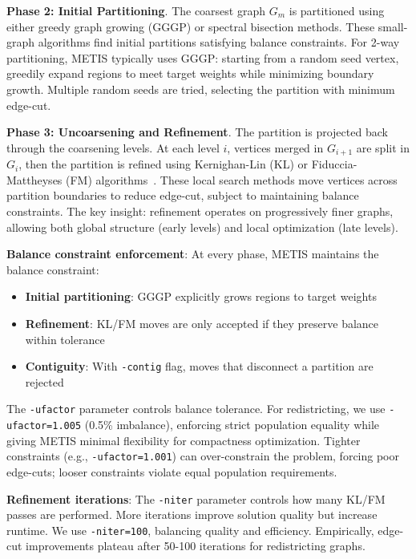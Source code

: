 \textbf{Phase 2: Initial Partitioning}. The coarsest graph $G_m$ is partitioned using either greedy graph growing (GGGP) or spectral bisection methods. These small-graph algorithms find initial partitions satisfying balance constraints. For 2-way partitioning, METIS typically uses GGGP: starting from a random seed vertex, greedily expand regions to meet target weights while minimizing boundary growth. Multiple random seeds are tried, selecting the partition with minimum edge-cut.

\textbf{Phase 3: Uncoarsening and Refinement}. The partition is projected back through the coarsening levels. At each level $i$, vertices merged in $G_{i+1}$ are split in $G_i$, then the partition is refined using Kernighan-Lin (KL) or Fiduccia-Mattheyses (FM) algorithms~\cite{kernighan1970efficient,fiduccia1982linear}. These local search methods move vertices across partition boundaries to reduce edge-cut, subject to maintaining balance constraints. The key insight: refinement operates on progressively finer graphs, allowing both global structure (early levels) and local optimization (late levels).

\textbf{Balance constraint enforcement}: At every phase, METIS maintains the balance constraint:
\begin{itemize}
\item \textbf{Initial partitioning}: GGGP explicitly grows regions to target weights
\item \textbf{Refinement}: KL/FM moves are only accepted if they preserve balance within tolerance
\item \textbf{Contiguity}: With \texttt{-contig} flag, moves that disconnect a partition are rejected
\end{itemize}

The \texttt{-ufactor} parameter controls balance tolerance. For redistricting, we use \texttt{-ufactor=1.005} (0.5\% imbalance), enforcing strict population equality while giving METIS minimal flexibility for compactness optimization. Tighter constraints (e.g., \texttt{-ufactor=1.001}) can over-constrain the problem, forcing poor edge-cuts; looser constraints violate equal population requirements.

\textbf{Refinement iterations}: The \texttt{-niter} parameter controls how many KL/FM passes are performed. More iterations improve solution quality but increase runtime. We use \texttt{-niter=100}, balancing quality and efficiency. Empirically, edge-cut improvements plateau after 50-100 iterations for redistricting graphs.


